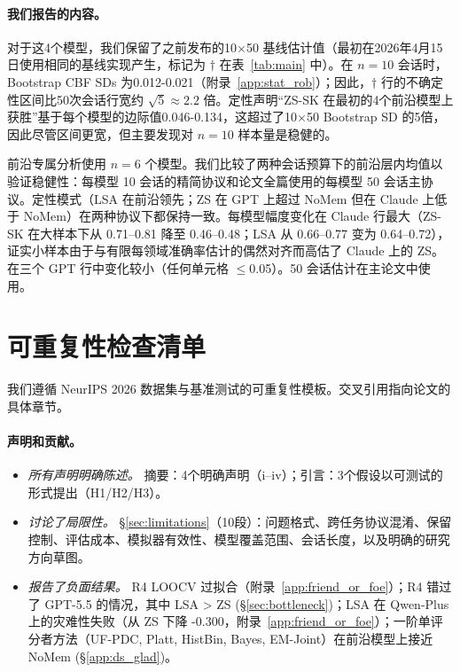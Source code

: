 \documentclass[11pt,a4paper,fontset=fandol]{ctexart}
\begin{document}
\paragraph{我们报告的内容。} 对于这4个模型，我们保留了之前发布的10$\times$50 基线估计值（最初在2026年4月15日使用相同的基线实现产生，标记为 $\dagger$ 在表~\ref{tab:main} 中）。在 $n=10$ 会话时，Bootstrap CBF SDs 为0.012-0.021（附录~\ref{app:stat_rob}）；因此，$\dagger$ 行的不确定性区间比50次会话行宽约 $\sqrt{5}\approx2.2$ 倍。定性声明“ZS-SK 在最初的4个前沿模型上获胜”基于每个模型的边际值0.046-0.134，这超过了10$\times$50 Bootstrap SD 的5倍，因此尽管区间更宽，但主要发现对 $n=10$ 样本量是稳健的。

前沿专属分析使用 $n=6$ 个模型。我们比较了两种会话预算下的前沿层内均值以验证稳健性：每模型 10 会话的精简协议和论文全篇使用的每模型 50 会话主协议。定性模式（LSA 在前沿领先；ZS 在 GPT 上超过 NoMem 但在 Claude 上低于 NoMem）在两种协议下都保持一致。每模型幅度变化在 Claude 行最大（ZS-SK 在大样本下从 0.71--0.81 降至 0.46--0.48；LSA 从 0.66--0.77 变为 0.64--0.72），证实小样本由于与有限每领域准确率估计的偶然对齐而高估了 Claude 上的 ZS。在三个 GPT 行中变化较小（任何单元格 $\le$0.05）。50 会话估计在主论文中使用。

\section{可重复性检查清单}
\label{app:repro_checklist}

我们遵循 NeurIPS 2026 数据集与基准测试的可重复性模板。交叉引用指向论文的具体章节。

\paragraph{声明和贡献。}
\begin{itemize}[nosep,leftmargin=1.4em]
  \item \emph{所有声明明确陈述。} \checkmark{} 摘要：4个明确声明（i--iv）；引言：3个假设以可测试的形式提出（H1/H2/H3）。
  \item \emph{讨论了局限性。} \checkmark{} \S\ref{sec:limitations}（10段）：问题格式、跨任务协议混淆、保留控制、评估成本、模拟器有效性、模型覆盖范围、会话长度，以及明确的研究方向草图。
  \item \emph{报告了负面结果。} \checkmark{} R4 LOOCV 过拟合（附录~\ref{app:friend_or_foe}）；R4 错过了 GPT-5.5 的情况，其中 LSA > ZS (\S\ref{sec:bottleneck})；LSA 在 Qwen-Plus 上的灾难性失败（从 ZS 下降 -0.300，附录~\ref{app:friend_or_foe}）；一阶单评分者方法（UF-PDC, Platt, HistBin, Bayes, EM-Joint）在前沿模型上接近 NoMem (\S\ref{app:ds_glad})。
\end{itemize}
\end{document}
